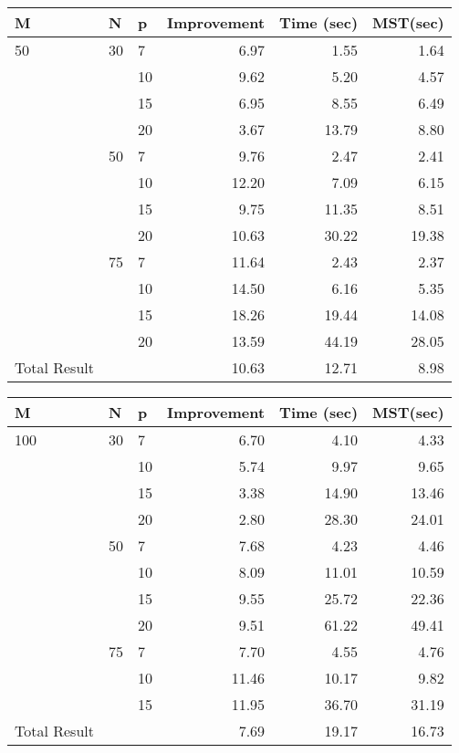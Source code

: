 \begin{center}
  \begin{tabular}{|l|l|l|r|r|r|}
    \hline
    M & N & p & Improvement & Time (sec) & MST(sec) \\ \hline
    50 & 30 & 7 & 6.97 & 1.55 & 1.64 \\
    &  & 10 & 9.62 & 5.20 & 4.57 \\
    &  & 15 & 6.95 & 8.55 & 6.49 \\
    &  & 20 & 3.67 & 13.79 & 8.80 \\ \cline{2-6}
    & 50 & 7 & 9.76 & 2.47 & 2.41 \\
    &  & 10 & 12.20 & 7.09 & 6.15 \\
    &  & 15 & 9.75 & 11.35 & 8.51 \\
    &  & 20 & 10.63 & 30.22 & 19.38 \\ \cline{2-6}
    & 75 & 7 & 11.64 & 2.43 & 2.37 \\
    &  & 10 & 14.50 & 6.16 & 5.35 \\
    &  & 15 & 18.26 & 19.44 & 14.08 \\
    &  & 20 & 13.59 & 44.19 & 28.05 \\ \hline
    Total Result &  &  & 10.63 & 12.71 & 8.98 \\ 
    \hline
  \end{tabular}
\end{center}

\begin{center}
  \begin{tabular}{|l|l|l|r|r|r|}
    \hline
    M & N & p & Improvement & Time (sec) & MST(sec) \\ \hline
    100 & 30 & 7 & 6.70 & 4.10 & 4.33 \\
    &  & 10 & 5.74 & 9.97 & 9.65 \\
    &  & 15 & 3.38 & 14.90 & 13.46 \\
    &  & 20 & 2.80 & 28.30 & 24.01 \\ \cline{2-6}
    & 50 & 7 & 7.68 & 4.23 & 4.46 \\
    &  & 10 & 8.09 & 11.01 & 10.59 \\
    &  & 15 & 9.55 & 25.72 & 22.36 \\
    &  & 20 & 9.51 & 61.22 & 49.41 \\ \cline{2-6}
    & 75 & 7 & 7.70 & 4.55 & 4.76 \\
    &  & 10 & 11.46 & 10.17 & 9.82 \\
    &  & 15 & 11.95 & 36.70 & 31.19 \\ \hline
    Total Result &  &  & 7.69 & 19.17 & 16.73 \\ 
    \hline
  \end{tabular}
\end{center}
